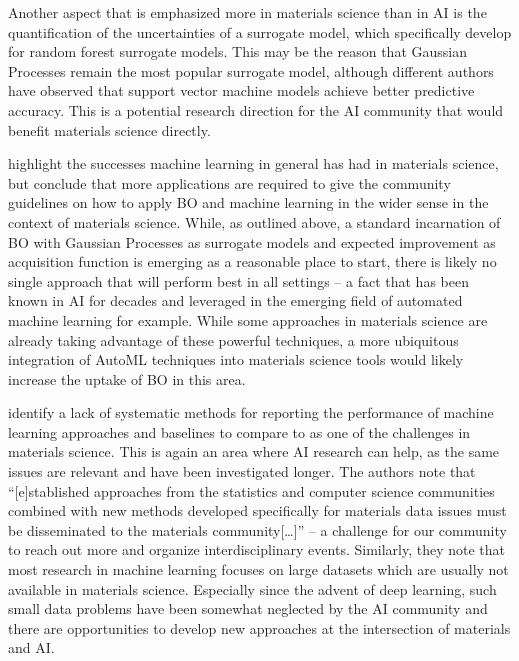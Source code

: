 \documentclass{article}
\begin{document}
Another aspect that is emphasized more in materials science than in AI is the
quantification of the uncertainties of a surrogate model, which
\cite{ling_high-dimensional_2017} specifically develop for random forest
surrogate models. This may be the reason that Gaussian Processes remain the most
popular surrogate model, although different authors have observed that support
vector machine models achieve better predictive accuracy. This is a potential
research direction for the AI community that would benefit materials science
directly.

\cite{lookman_perspective_2016} highlight the successes machine learning in
general has had in materials science, but conclude that more applications are
required to give the community guidelines on how to apply BO and machine
learning in the wider sense in the context of materials science. While, as
outlined above, a standard incarnation of BO with Gaussian Processes as
surrogate models and expected improvement as acquisition function is emerging as
a reasonable place to start, there is likely no single approach that will
perform best in all settings -- a fact that has been known in AI for decades and
leveraged in the emerging field of automated machine learning
\cite{hutter_automated_2019} for example. While some approaches in materials
science are already taking advantage of these powerful techniques, a more
ubiquitous integration of AutoML techniques into materials science tools would
likely increase the uptake of BO in this area.

\cite{de_pablo_new_2019} identify a lack of systematic methods for reporting the
performance of machine learning approaches and baselines to compare to as one of
the challenges in materials science. This is again an area where AI research can
help, as the same issues are relevant and have been investigated longer. The
authors note that ``[e]stablished approaches from the statistics and computer
science communities combined with new methods developed specifically for
materials data issues must be disseminated to the materials community[\ldots]''
-- a challenge for our community to reach out more and organize
interdisciplinary events. Similarly, they note that most research in machine
learning focuses on large datasets which are usually not available in materials
science. Especially since the advent of deep learning, such small data problems
have been somewhat neglected by the AI community and there are opportunities to
develop new approaches at the intersection of materials and AI.
\end{document}
